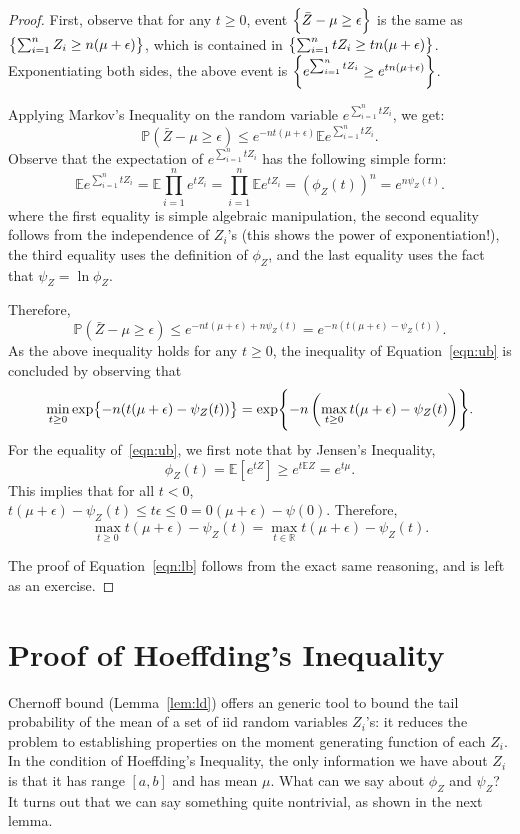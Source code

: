 \documentclass{article}
\newcommand{\RR}{\mathbb{R}} %
\newcommand{\EE}{\mathbb{E}} %
\newcommand{\PP}{\mathbb{P}} %
\begin{document}
\begin{proof}
First, observe that for any $t \geq 0$, event $\cbr{\bar{Z} - \mu \geq \epsilon}$ is the same as $\cbr{\sum_{i=1}^n Z_i \geq n (\mu + \epsilon)}$, which is contained in
$\cbr{\sum_{i=1}^n t Z_i \geq t n (\mu + \epsilon)}$. Exponentiating both sides, the above event is $\cbr{e^{\sum_{i=1}^n t Z_i} \geq e^{t n (\mu + \epsilon)} }$.

Applying Markov's Inequality on the random variable $e^{\sum_{i=1}^n t Z_i}$, we get:
\[ \PP(\bar{Z} - \mu \geq \epsilon) \leq e^{-n t (\mu+\epsilon)} \EE e^{\sum_{i=1}^n t Z_i}. \]
Observe that the expectation of $e^{\sum_{i=1}^n t Z_i}$ has the following simple form:
\[ \EE e^{\sum_{i=1}^n t Z_i} = \EE \prod_{i=1}^n e^{t Z_i} = \prod_{i=1}^n \EE e^{t Z_i} = (\phi_Z(t))^n = e^{n\psi_Z(t)}. \]
where the first equality is simple algebraic manipulation, the second equality follows from the independence of $Z_i$'s (this shows the power of exponentiation!), the third equality uses the definition of $\phi_Z$, and the last equality uses the fact that $\psi_Z = \ln \phi_Z$.

Therefore,
\[ \PP(\bar{Z} - \mu \geq \epsilon) \leq e^{- n t (\mu+\epsilon) + n \psi_Z(t)}
 = e^{-n( t (\mu+\epsilon) - \psi_Z(t))}. \]
As the above inequality holds for any $t \geq 0$, the inequality of Equation~\eqref{eqn:ub} is concluded
by observing that
\[ \min_{t \geq 0} \exp{-n( t (\mu+\epsilon) - \psi_Z(t))} = \exp{-n \del{\max_{t \geq 0} t (\mu+\epsilon) - \psi_Z(t)} }. \]
For the equality of~\eqref{eqn:ub}, we first note that by Jensen's Inequality,
\[ \phi_Z(t) = \EE[e^{tZ}] \geq e^{t \EE Z} = e^{t \mu}. \]
This implies that for all $t < 0$, $t (\mu+\epsilon) - \psi_Z(t) \leq t \epsilon \leq 0 = 0 (\mu+\epsilon) - \psi(0)$. Therefore,
\[ \max_{t \geq 0} t (\mu+\epsilon) - \psi_Z(t) = \max_{t \in \RR} t (\mu+\epsilon) - \psi_Z(t). \]

The proof of Equation~\eqref{eqn:lb} follows from the exact same reasoning, and is left as an exercise.
\end{proof}

\section{Proof of Hoeffding's Inequality}
Chernoff bound (Lemma~\ref{lem:ld}) offers an generic tool to bound the tail probability of the mean of
a set of iid random variables $Z_i$'s: it reduces the problem to establishing properties
on the moment generating function of each $Z_i$.
In the condition of Hoeffding's Inequality, the only information we have about $Z_i$
is that it has range $[a,b]$ and has mean $\mu$. What can we say about $\phi_Z$
and $\psi_Z$? It turns out that we can say something quite nontrivial, as shown in the next lemma.
\end{document}
